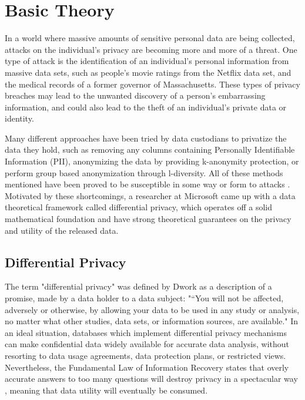 
\chapter{Basic Theory}
In a world where massive amounts of sensitive personal data are being collected, attacks on the individual's privacy are becoming more and more of a threat. One type of attack is the identification of an individual's personal information from massive data sets, such as people's movie ratings from the Netflix data set\cite{narayanan2008robust}, and the medical records of a former governor of Massachusetts\cite{barth2012re}. These types of privacy breaches may lead to the unwanted discovery of a person's embarrassing information, and could also lead to the theft of an individual's private data or identity.  

Many different approaches have been tried by data custodians to privatize the data they hold, such as removing any columns containing Personally Identifiable Information (PII), anonymizing the data by providing k-anonymity protection\cite{sweeney2002k}, or perform group based anonymization through l-diversity\cite{machanavajjhala2007diversity}. All of these methods mentioned have been proved to be susceptible in some way or form to attacks \cite{ganta2008composition}. Motivated by these shortcomings, a researcher at Microsoft came up with a data theoretical framework called differential privacy, which operates off a solid mathematical foundation and have strong theoretical guarantees on the privacy and utility of the released data.

\section{Differential Privacy}
The term "differential privacy" was defined by Dwork as a description of a promise, made by a data holder to a data subject: "“You will not be affected, adversely or otherwise, by allowing your data to be used in any study or analysis, no matter what other studies, data sets, or information sources, are available." \cite{dwork2013algorithmic}
In an ideal situation, databases which implement differential privacy mechanisms can make confidential data widely available for accurate data analysis, without resorting to data usage agreements, data protection plans, or restricted views. Nevertheless, the Fundamental Law of Information Recovery states that overly accurate answers to too many questions will destroy privacy in a spectacular way \cite{dwork2013algorithmic}, meaning that data utility will eventually be consumed.

